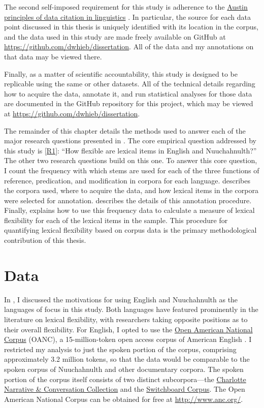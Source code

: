 The second self-imposed requirement for this study is adherence to the \href{https://site.uit.no/linguisticsdatacitation/}{Austin principles of data citation in linguistics} \parencite{BerezKroekeretal2018}. In particular, the source for each data point discussed in this thesis is uniquely identified with its location in the corpus, and the data used in this study are made freely available on GitHub at \url{https://github.com/dwhieb/dissertation}. All of the data and my annotations on that data may be viewed there.

Finally, as a matter of scientific accountability, this study is designed to be replicable using the same or other datasets. All of the technical details regarding how to acquire the data, annotate it, and run statistical analyses for those data are documented in the GitHub repository for this project, which may be viewed at \url{https://github.com/dwhieb/dissertation}.

The remainder of this chapter details the methods used to answer each of the major research questions presented in . The core empirical question addressed by this study is \ref{R1}: \enquote{How flexible are lexical items in English and Nuuchahnulth?} The other two research questions build on this one. To answer this core question, I count the frequency with which stems are used for each of the three functions of reference, predication, and modification in corpora for each language.  describes the corpora used, where to acquire the data, and how lexical items in the corpora were selected for annotation.  describes the details of this annotation procedure. Finally,  explains how to use this frequency data to calculate a measure of lexical flexibility for each of the lexical items in the sample. This procedure for quantifying lexical flexibility based on corpus data is the primary methodological contribution of this thesis.

\section{Data}
\label{sec:3.2}

In , I discussed the motivations for using English and Nuuchahnulth as the languages of focus in this study. Both languages have featured prominently in the literature on lexical flexibility, with researchers taking opposite positions as to their overall flexibility. For English, I opted to use the \href{http://www.anc.org/}{Open American National Corpus} (OANC), a 15-million-token open access corpus of American English \parencite{IdeSuderman2005}. I restricted my analysis to just the spoken portion of the corpus, comprising approximately 3.2 million tokens, so that the data would be comparable to the spoken corpus of Nuuchahnulth and other documentary corpora. The spoken portion of the corpus itself consists of two distinct subcorpora—the \href{https://newsouthvoices.uncc.edu/}{Charlotte Narrative \& Conversation Collection}  and the \href{https://catalog.ldc.upenn.edu/LDC97S62}{Switchboard Corpus}. The Open American National Corpus can be obtained for free at \url{http://www.anc.org/}.

